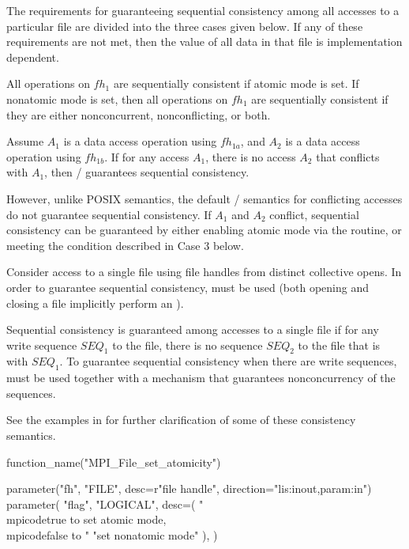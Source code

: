 The requirements for guaranteeing sequential consistency among all
accesses to a particular file are divided into the three cases given
below.  If any of these requirements are not met, then the value of
all data in that file is implementation dependent.

All operations on $fh_1$ are sequentially consistent if atomic mode
is set.  If nonatomic mode is set, then all operations on $fh_1$ 
are sequentially consistent if they are either nonconcurrent, nonconflicting,
or both.

Assume $A_1$ is a data access operation using $fh_{1a}$,
and    $A_2$ is a data access operation using $fh_{1b}$.
If for any access $A_1$, there is no access $A_2$ that conflicts
with $A_1$, then \MPI/ guarantees sequential consistency.

However, unlike POSIX semantics, the default \MPI/ semantics
for conflicting accesses
do not guarantee sequential consistency.
If $A_1$ and $A_2$ conflict,
sequential consistency can be guaranteed by either
enabling atomic mode via the  routine, or
meeting the 
condition
described in Case 3 below.

Consider access to a single file using file handles from distinct
collective opens.
In order to guarantee sequential consistency, 
must be used (both opening and closing a file implicitly perform an
).

Sequential consistency is guaranteed among accesses to a single file if
for any write sequence $SEQ_1$ to the file,
there is no sequence $SEQ_2$ to the file that
is  with
$SEQ_1$.
To guarantee sequential consistency when there are write sequences,
 must be used
together with a mechanism that guarantees nonconcurrency of the sequences.

See the examples in  for
further clarification of some of these consistency semantics.


%
\begin{mpi-binding}
    function_name("MPI_File_set_atomicity")
    
    parameter("fh", "FILE", desc=r"file handle", direction="lis:inout,param:in")
    parameter(
        "flag",
        "LOGICAL",
        desc=(
            "\\mpicode{true} to set atomic mode, \\mpicode{false} to "
            "set nonatomic mode"
        ),
    )
\end{mpi-binding}

